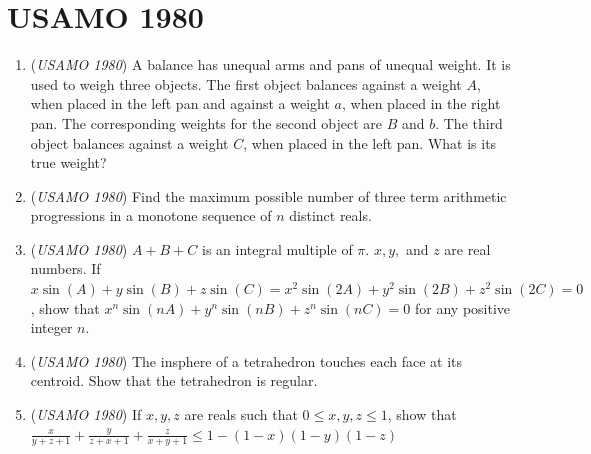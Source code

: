 \section{USAMO 1980}
        \begin{enumerate}
        	\item (\textit{USAMO 1980}) A balance has unequal arms and pans of unequal weight. It is used to weigh three objects. The first object balances against a weight $A$, when placed in the left pan and against a weight $a$, when placed in the right pan. The corresponding weights for the second object are $B$ and $b$. The third object balances against a weight $C$, when placed in the left pan. What is its true weight?


 

	\item (\textit{USAMO 1980}) Find the maximum possible number of three term arithmetic progressions in a monotone sequence of $n$ distinct reals.


 

	\item (\textit{USAMO 1980}) $A + B + C$ is an integral multiple of $\pi$. $x, y,$ and $z$ are real numbers. If $x\sin(A)+y\sin(B)+z\sin(C)=x^2\sin(2A)+y^2\sin(2B)+z^2\sin(2C)=0$, show that $x^n\sin(nA)+y^n \sin(nB) +z^n \sin(nC)=0$ for any positive integer $n$.


 

	\item (\textit{USAMO 1980}) The insphere of a tetrahedron touches each face at its centroid. Show that the tetrahedron is regular.


 

	\item (\textit{USAMO 1980}) If $x, y, z$ are reals such that $0\le x, y, z \le 1$, show that $\frac{x}{y + z + 1} + \frac{y}{z + x + 1} + \frac{z}{x + y +  1} \le 1 - (1 - x)(1 - y)(1 - z)$


\end{enumerate}